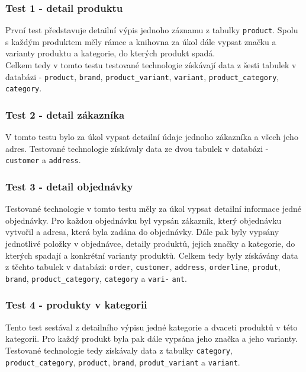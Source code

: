 \documentclass[ing,male,java,dept456]{diploma}						%
\begin{document}
\subsubsection{Test 1 - detail produktu}
První test představuje detailní výpis jednoho záznamu z tabulky \lstinline[style=inlinepython]|product|. Spolu s každým produktem měly rámce a knihovna za úkol dále vypsat značku a varianty produktu a kategorie, do kterých produkt spadá. \\
Celkem tedy v tomto testu testované technologie získávají data z šesti tabulek v databázi - \lstinline[style=inlinepython]|product|, \lstinline[style=inlinepython]|brand|, \lstinline[style=inlinepython]|product_variant|, \lstinline[style=inlinepython]|variant|, \lstinline[style=inlinepython]|product_category|, \lstinline[style=inlinepython]|category|.

\subsubsection{Test 2 - detail zákazníka}
V tomto testu bylo za úkol vypsat detailní údaje jednoho zákazníka a všech jeho adres. Testované technologie získávaly data ze dvou tabulek v databázi - \lstinline[style=inlinepython]|customer| a \lstinline[style=inlinepython]|address|.

\subsubsection{Test 3 - detail objednávky}
Testované technologie v tomto testu měly za úkol vypsat detailní informace jedné objednávky. Pro každou objednávku byl vypsán zákazník, který objednávku vytvořil a adresa, která byla zadána do objednávky. Dále pak byly vypsány jednotlivé položky v objednávce, detaily produktů, jejich značky a kategorie, do kterých spadají a konkrétní varianty produktů.
Celkem tedy byly získávány data z těchto tabulek v databázi: \lstinline[style=inlinepython]|order|, \lstinline[style=inlinepython]|customer|, \lstinline[style=inlinepython]|address|, \lstinline[style=inlinepython]|orderline|, \lstinline[style=inlinepython]|produt|, \lstinline[style=inlinepython]|brand|, \lstinline[style=inlinepython]|product_category|, \lstinline[style=inlinepython]|category| a \lstinline[style=inlinepython]|vari-| \lstinline[style=inlinepython]|ant|.

\subsubsection{Test 4 - produkty v kategorii}
Tento test sestával z detailního výpisu jedné kategorie a dvaceti produktů v této kategorii. Pro každý produkt byla pak dále vypsána jeho značka a jeho varianty. \\
Testované technologie tedy získávaly data z tabulky \lstinline[style=inlinepython]|category|, \lstinline[style=inlinepython]|product_category|, \lstinline[style=inlinepython]|product|, \lstinline[style=inlinepython]|brand|, \lstinline[style=inlinepython]|produt_variant| a \lstinline[style=inlinepython]|variant|.
\end{document}
